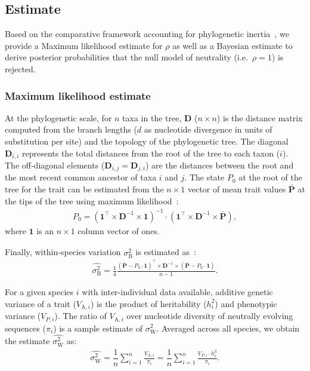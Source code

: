 \documentclass{article}
\newcommand{\Multiply}{\cdot}
\newcommand{\MultiplyMatrix}{\times}
\newcommand{\UniDimArray}[1]{\bm{#1}}
\newcommand{\BiDimArray}[1]{\bm{#1}}
\newcommand{\tr}{^{\intercal}}
\newcommand{\inv}{^{-1}}
\newcommand{\Spi}{i}
\newcommand{\Spj}{j}
\newcommand{\NbrTaxa}{n}
\newcommand{\Trait}{P}
\newcommand{\Heritability}{h^2}
\newcommand{\VecTrait}{\UniDimArray{\bar{\Trait}}}
\newcommand{\Root}{0}
\newcommand{\RootTrait}{\Trait_{\Root}}
\newcommand{\VecOne}{\UniDimArray{1}}
\newcommand{\Distance}{\BiDimArray{D}}
\newcommand{\DistanceMatrix}{\BiDimArray{\Distance}}
\newcommand{\VarGeneticSpi}{V_{\mathrm{A}, \Spi}}
\newcommand{\RateBetween}{\sigma^2_{\mathrm{B}}}
\newcommand{\RateWhithin}{\sigma^2_{\mathrm{W}}}
\newcommand{\EstRateBetween}{\widehat{\RateBetween}}
\newcommand{\EstRateWhithin}{\widehat{\RateWhithin}}
\newcommand{\NI}{\rho}
\begin{document}
\subsection*{Estimate}\label{subsec:estimate}

Based on the comparative framework accounting for phylogenetic inertia~\parencite{felsenstein_phylogenies_1985, omeara_testing_2006}, we provide a Maximum likelihood estimate for $\NI$ as well as a Bayesian estimate to derive posterior probabilities that the null model of neutrality (i.e.~$\NI = 1$) is rejected.

\subsubsection*{Maximum likelihood estimate}
At the phylogenetic scale, for $\NbrTaxa$ taxa in the tree, $\DistanceMatrix$ ($\NbrTaxa \times \NbrTaxa$) is the distance matrix computed from the branch lengths ($d$ as nucleotide divergence in units of substitution per site) and the topology of the phylogenetic tree.
The diagonal $\Distance_{\Spi,\Spi}$ represents the total distances from the root of the tree to each taxon ($\Spi$).
The off-diagonal elements ($\Distance_{\Spi,\Spj} = \Distance_{\Spj,\Spi}$) are the distances between the root and the most recent common ancestor of taxa $\Spi$ and $\Spj$.
The state $\RootTrait$ at the root of the tree for the trait can be estimated from the $\NbrTaxa \times 1$ vector of mean trait values $\VecTrait$ at the tips of the tree using maximum likelihood~\parencite{omeara_testing_2006}:
\begin{gather}
    \RootTrait = \left( \VecOne\tr \MultiplyMatrix \DistanceMatrix\inv \MultiplyMatrix \VecOne \right)\inv \Multiply \left( \VecOne\tr \MultiplyMatrix \DistanceMatrix\inv \MultiplyMatrix \VecTrait \right), \label{eq:estimated-root-trait}
\end{gather}
where $\VecOne$ is an $\NbrTaxa \times 1$ column vector of ones.

Finally, within-species variation $\EstRateBetween$ is estimated as~\parencite{omeara_testing_2006}:
\begin{gather}
    \EstRateBetween = \frac{1}{4}\frac{\left( \VecTrait -  \RootTrait \Multiply \VecOne \right)\tr \MultiplyMatrix \DistanceMatrix\inv \MultiplyMatrix \left( \VecTrait -  \RootTrait \Multiply \VecOne  \right)}{\NbrTaxa - 1}. \label{eq:estimated-rate-phy}
\end{gather}

For a given species $\Spi$ with inter-individual data available, additive genetic variance of a trait ($\VarGeneticSpi$) is the product of heritability ($\Heritability_{i}$) and phenotypic variance ($V_{\Trait, i}$).
The ratio of $\VarGeneticSpi$ over nucleotide diversity of neutrally evolving sequences ($\pi_{\Spi}$) is a sample estimate of $\RateWhithin$.
Averaged across all species, we obtain the estimate $\EstRateWhithin$ as:
\begin{gather}
    \EstRateWhithin = \dfrac{1}{\NbrTaxa}\sum_{i=1}^{\NbrTaxa}\frac{  \VarGeneticSpi}{ \pi_{i}} = \dfrac{1}{\NbrTaxa}\sum_{i=1}^{\NbrTaxa} \frac{  V_{\Trait, i} \Multiply \Heritability_{i}}{ \pi_{i}}. \label{eq:estimated-rate-pop}
\end{gather}
\end{document}
